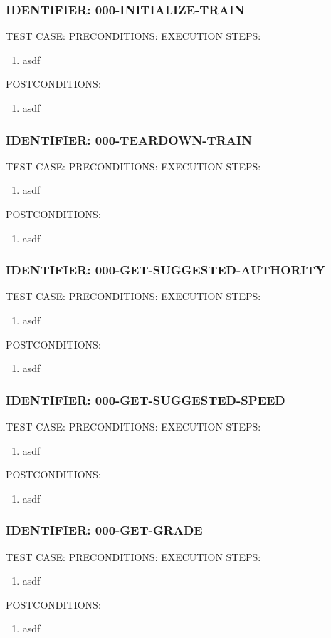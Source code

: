 \documentclass{scrreprt}
\begin{document}
\subsubsection{IDENTIFIER: 000-INITIALIZE-TRAIN}
TEST CASE:
PRECONDITIONS:
EXECUTION STEPS:
\begin{enumerate}
	\item asdf
\end{enumerate}
POSTCONDITIONS:
\begin{enumerate}
	\item asdf
\end{enumerate}

\subsubsection{IDENTIFIER: 000-TEARDOWN-TRAIN}
TEST CASE:
PRECONDITIONS:
EXECUTION STEPS:
\begin{enumerate}
	\item asdf
\end{enumerate}
POSTCONDITIONS:
\begin{enumerate}
	\item asdf
\end{enumerate}

\subsubsection{IDENTIFIER: 000-GET-SUGGESTED-AUTHORITY}
TEST CASE:
PRECONDITIONS:
EXECUTION STEPS:
\begin{enumerate}
	\item asdf
\end{enumerate}
POSTCONDITIONS:
\begin{enumerate}
	\item asdf
\end{enumerate}

\subsubsection{IDENTIFIER: 000-GET-SUGGESTED-SPEED}
TEST CASE:
PRECONDITIONS:
EXECUTION STEPS:
\begin{enumerate}
	\item asdf
\end{enumerate}
POSTCONDITIONS:
\begin{enumerate}
	\item asdf
\end{enumerate}

\subsubsection{IDENTIFIER: 000-GET-GRADE}
TEST CASE:
PRECONDITIONS:
EXECUTION STEPS:
\begin{enumerate}
	\item asdf
\end{enumerate}
POSTCONDITIONS:
\begin{enumerate}
	\item asdf
\end{enumerate}
\end{document}
